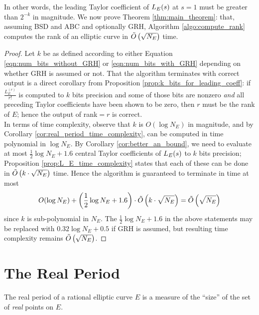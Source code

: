 In other words, the leading Taylor coefficient of $L_E(s)$ at $s=1$ must be greater than $2^{-k}$ in magnitude. We now prove Theorem \ref{thm:main_theorem}: that, assuming BSD and ABC and optionally GRH, Algorithm \ref{algo:compute_rank} computes the rank of an elliptic curve in $\tilde{O}\left(\sqrt{N_E}\right)$ time.
\begin{proof}
Let $k$ be as defined according to either Equation \ref{eqn:num_bits_without_GRH} or \ref{eqn:num_bits_with_GRH} depending on whether GRH is assumed or not. That the algorithm terminates with correct output is a direct corollary from Proposition \ref{prop:k_bits_for_leading_coeff}: if $\frac{L_E^{(r)}}{r!}$ is computed to $k$ bits precision and some of those bits are nonzero {\it and} all preceding Taylor coefficients have been shown to be zero, then $r$ must be the rank of $E$; hence the output of rank$=r$ is correct. \\

In terms of time complexity, observe that $k$ is $O(\log N_E)$ in magnitude, and by Corollary \ref{cor:real_period_time_complexity}, can be computed in time polynomial in $\log N_E$. By Corollary \ref{cor:better_an_bound}, we need to evaluate at most $\frac{1}{2}\log N_E +1.6$ central Taylor coefficients of $L_E(s)$ to $k$ bits precision; Proposition \ref{prop:L_E_time_complexity} states that each of these can be done in $\tilde{O}\left(k\cdot \sqrt{N_E}\right)$ time. Hence the algorithm is guaranteed to terminate in time at most 
\begin{equation}
O(\log N_E) + \left(\frac{1}{2}\log N_E + 1.6\right) \cdot \tilde{O}\left(k\cdot \sqrt{N_E}\right) = \tilde{O}\left(\sqrt{N_E}\right)
\end{equation}
since $k$ is sub-polynomial in $N_E$. The $\frac{1}{2}\log N_E + 1.6$ in the above statements may be replaced with $0.32\log N_E + 0.5$ if GRH is assumed, but resulting time complexity remains $\tilde{O}\left(\sqrt{N_E}\right)$.
\end{proof}


\newpage
\section{The Real Period}

The real period of a rational elliptic curve $E$ is a measure of the ``size'' of the set of {\it real} points on $E$. \\

